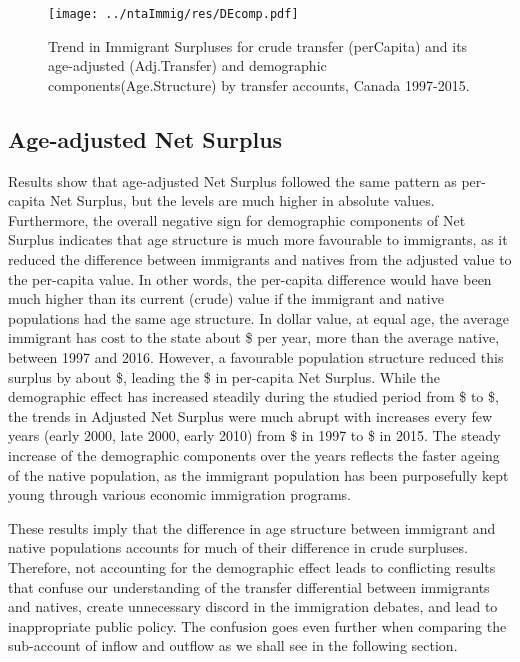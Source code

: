 \begin{figure}[H]%
  \caption{Trend in Immigrant Surpluses for crude transfer (perCapita) and its age-adjusted (Adj.Transfer) and demographic components(Age.Structure) by transfer accounts, Canada 1997-2015.}
  \texttt{[image: ../ntaImmig/res/DEcomp.pdf]}%
  \label{fig:DEcomp}%
\end{figure}%

\subsection{Age-adjusted Net Surplus}

Results show that age-adjusted Net Surplus followed the same pattern as per-capita Net Surplus, but the levels are much higher in absolute values.
Furthermore, the overall negative sign for demographic components of Net Surplus indicates that age structure is much more favourable to immigrants, as it reduced the difference between immigrants and natives from the adjusted value to the per-capita value.
In other words, the per-capita difference would have been much higher than its current (crude) value if the immigrant and native populations had the same age structure.
In dollar value, at equal age, the average immigrant has cost to the state about \$ per year, more than the average native, between 1997 and 2016.
However, a favourable population structure reduced this surplus by about \$, leading the \$ in per-capita Net Surplus.
While the demographic effect has increased steadily during the studied period from \$ to \$, the trends in Adjusted Net Surplus were much abrupt with increases every few years (early 2000, late 2000, early 2010) from \$ in 1997 to \$ in 2015.
The steady increase of the demographic components over the years reflects the faster ageing of the native population, as the immigrant population has been purposefully kept young through various economic immigration programs.

\vspace{0.7em}\par
These results imply that the difference in age structure between immigrant and native populations accounts for much of their difference in crude surpluses.
Therefore, not accounting for the demographic effect leads to conflicting results that confuse our understanding of the transfer differential between immigrants and natives, create unnecessary discord in the immigration debates, and lead to inappropriate public policy.
The confusion goes even further when comparing the sub-account of inflow and outflow as we shall see in the following section.

